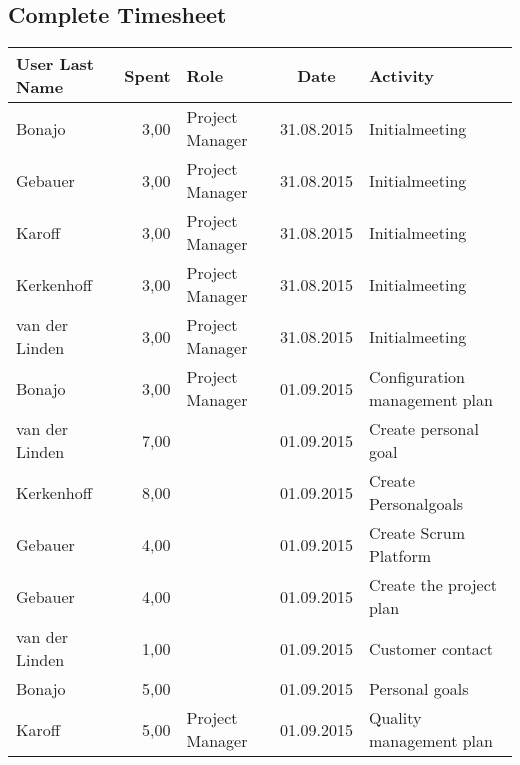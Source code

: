 \subsection{Complete Timesheet}
	\renewcommand{\arraystretch}{1.75}
	\begin{longtable}{ l r p{2cm} c p{4cm} }
		\textbf{User Last Name} & \textbf{Spent} & \textbf{Role}   & \textbf{Date} & \textbf{Activity}                            \\
		\hline
		\endhead
		Bonajo                  & 3,00           & Project Manager & 31.08.2015    & Initialmeeting                               \\
		Gebauer                 & 3,00           & Project Manager & 31.08.2015    & Initialmeeting                               \\
		Karoff                  & 3,00           & Project Manager & 31.08.2015    & Initialmeeting                               \\
		Kerkenhoff              & 3,00           & Project Manager & 31.08.2015    & Initialmeeting                               \\
		van der Linden          & 3,00           & Project Manager & 31.08.2015    & Initialmeeting                               \\
		Bonajo                  & 3,00           & Project Manager & 01.09.2015    & Configuration management plan                \\
		van der Linden          & 7,00           &                 & 01.09.2015    & Create personal goal                         \\
		Kerkenhoff              & 8,00           &                 & 01.09.2015    & Create Personalgoals                         \\
		Gebauer                 & 4,00           &                 & 01.09.2015    & Create Scrum Platform                        \\
		Gebauer                 & 4,00           &                 & 01.09.2015    & Create the project plan                      \\
		van der Linden          & 1,00           &                 & 01.09.2015    & Customer contact                             \\
		Bonajo                  & 5,00           &                 & 01.09.2015    & Personal goals                               \\
		Karoff                  & 5,00           & Project Manager & 01.09.2015    & Quality management plan                      \\

\end{longtable}

